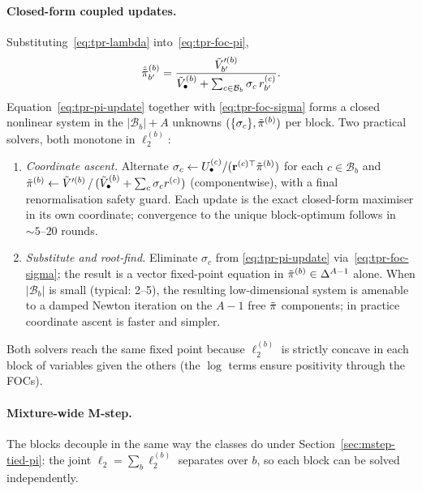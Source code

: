 \paragraph{Closed-form coupled updates.}
Substituting~\eqref{eq:tpr-lambda} into~\eqref{eq:tpr-foc-pi},
\begin{equation}\label{eq:tpr-pi-update}
\hat{\tilde{\pi}}^{(b)}_{b'} = \frac{\tilde V'^{(b)}_{b'}}
   {\tilde V_\bullet^{(b)}
    + \sum_{c\in\mathcal{B}_b} \sigma_c\, r^{(c)}_{b'}}.
\end{equation}
Equation~\eqref{eq:tpr-pi-update} together with
\eqref{eq:tpr-foc-sigma} forms a closed nonlinear system in the
$|\mathcal{B}_b|+A$ unknowns $(\{\sigma_c\}, \tilde{\pi}^{(b)})$ per
block.  Two practical solvers, both monotone in $\ell_2^{(b)}$:

\begin{enumerate}
\item \emph{Coordinate ascent.}  Alternate
  $\sigma_c \leftarrow U^{(c)}_\bullet / (\mathbf{r}^{(c)\top}\tilde{\pi}^{(b)})$
  for each $c \in \mathcal{B}_b$ and
  $\tilde{\pi}^{(b)} \leftarrow \tilde V'^{(b)} \,/\,
  (\tilde V_\bullet^{(b)} + \sum_c \sigma_c r^{(c)})$ (componentwise),
  with a final renormalisation safety guard.  Each update is the
  exact closed-form maximiser in its own coordinate; convergence to
  the unique block-optimum follows in $\sim 5\text{--}20$ rounds.
\item \emph{Substitute and root-find.}  Eliminate $\sigma_c$ from
  \eqref{eq:tpr-pi-update} via~\eqref{eq:tpr-foc-sigma}; the result is
  a vector fixed-point equation in $\tilde{\pi}^{(b)} \in \Delta^{A-1}$
  alone.  When $|\mathcal{B}_b|$ is small (typical: 2--5), the
  resulting low-dimensional system is amenable to a damped Newton
  iteration on the $A-1$ free $\tilde{\pi}$ components; in practice
  coordinate ascent is faster and simpler.
\end{enumerate}
Both solvers reach the same fixed point because $\ell_2^{(b)}$ is
strictly concave in each block of variables given the others (the
$\log$ terms ensure positivity through the FOCs).

\paragraph{Mixture-wide M-step.}
The blocks decouple in the same way the classes do under
Section~\ref{sec:mstep-tied-pi}: the joint
$\ell_2 = \sum_b \ell_2^{(b)}$ separates over $b$, so each block can
be solved independently.

